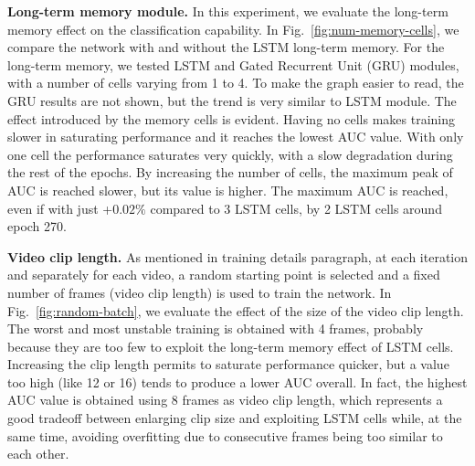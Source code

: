 
\noindent\textbf{Long-term memory module.}
In this experiment, we evaluate the long-term memory effect on the classification capability.
In Fig.~\ref{fig:num-memory-cells}, we compare the network with and without the LSTM long-term memory.
For the long-term memory, we tested LSTM and Gated Recurrent Unit (GRU) modules, with a number of cells varying from 1 to 4.
To make the graph easier to read, the GRU results are not shown, but the trend is very similar to LSTM module. 
The effect introduced by the memory cells is evident.
Having no cells makes training slower in saturating performance and it reaches the lowest AUC value.
With only one cell the performance saturates very quickly, with a slow degradation during the rest of the epochs.
By increasing the number of cells, the maximum peak of AUC is reached slower, but its value is higher. The maximum AUC is reached, even if with just +$0.02\%$ compared to 3 LSTM cells, by 2 LSTM cells around epoch 270.


\noindent\textbf{Video clip length.}
As mentioned in training details paragraph, at each iteration and separately for each video, a random starting point is selected and a fixed number of frames (video clip length) is used to train the network.
In Fig.~\ref{fig:random-batch}, we evaluate the effect of the size of the video clip length.
The worst and most unstable training is obtained with 4 frames, probably because they are too few to exploit the long-term memory effect of LSTM cells. 
Increasing the clip length permits to saturate performance quicker, but a value too high (like 12 or 16) tends to produce a lower AUC overall.
In fact, the highest AUC value is obtained using 8 frames as video clip length, which represents a good tradeoff between enlarging clip size and exploiting LSTM cells while, at the same time, avoiding overfitting due to consecutive frames being too similar to each other.

